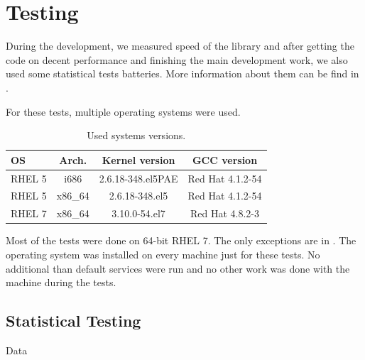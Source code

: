 \chapter{Testing} \label{chap:testing}

During the development, we measured speed of the library and after getting the code on decent performance and finishing the main development work, we also used some statistical tests batteries. More information about them can be find in .

For these tests, multiple operating systems were used.
\begin{table}[h!]
  \begin{center}
    \begin{tabular}{|l|c|c|c|}
      \hline
      OS & Arch. & Kernel version & GCC version\\
      \hline
      \hline
      RHEL 5 & i686 & 2.6.18-348.el5PAE & Red Hat 4.1.2-54\\
      \hline
      RHEL 5 & x86\_64 & 2.6.18-348.el5 & Red Hat 4.1.2-54\\
      \hline
      RHEL 7 & x86\_64 & 3.10.0-54.el7 & Red Hat 4.8.2-3\\
      \hline
    \end{tabular}
    \caption{Used systems versions.}
    \label{tab:testing:systems}
  \end{center}
\end{table}

Most of the tests were done on 64-bit RHEL 7. The only exceptions are in . The operating system was installed on every machine just for these tests. No additional than default services were run and no other work was done with the machine during the tests.




\section{Statistical Testing}\label{sec:testing:statistical-testing}
Data
\par {} %
\par {} %

